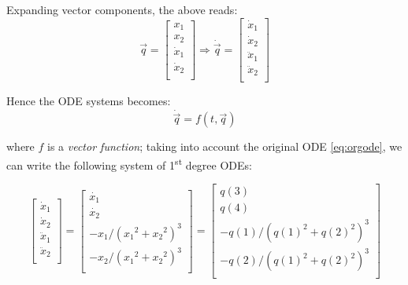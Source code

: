 \documentclass[12pt,a4paper,twoside]{report}
\begin{document}
Expanding vector components, the above reads:
\begin{equation}
  \vec{q} = 
  \begin{bmatrix}
    x_1 \\
    x_2 \\
    \dot{x}_1 \\
    \dot{x}_2 \\
  \end{bmatrix}
\Rightarrow
  \dot{\vec{q}} = 
  \begin{bmatrix}
    \dot{x}_1 \\
    \dot{x}_2 \\
    \ddot{x}_1 \\
    \ddot{x}_2 \\
  \end{bmatrix}
\end{equation}

Hence the ODE systems becomes:
\begin{equation}
  \dot{\vec{q}} = f( t, \vec{q} )
\end{equation}

where \(f\) is a \emph{vector function}; taking into account the original ODE \ref{eq:orgode}, 
we can write the following system of 1\textsuperscript{st} degree ODEs:

\begin{equation}
  \begin{bmatrix}
    \dot{x}_1 \\
    \dot{x}_2 \\
    \ddot{x}_1 \\
    \ddot{x}_2 \\
  \end{bmatrix}
  =
  \begin{bmatrix}
    \dot{x_1} \\
    \dot{x_2} \\
    - x_1 / {({x_1}^2 + {x_2}^2)}^3 \\
    - x_2 / {({x_1}^2 + {x_2}^2)}^3 \\
  \end{bmatrix}
  =
  \begin{bmatrix}
    q(3) \\
    q(4) \\
    -q(1) / {(q(1)^2 +q(2)^2)}^3 \\
    -q(2) / {(q(1)^2 +q(2)^2)}^3 \\
  \end{bmatrix}
\end{equation}
\end{document}
